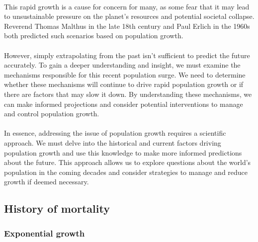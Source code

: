 \documentclass[../summary.tex]{subfiles}
\begin{document}
\ \\
This rapid growth is a cause for concern for many, as some fear that it may lead to unsustainable pressure on the planet's resources and potential societal collapse. Reverend Thomas Malthus in the late 18th century and Paul Erlich in the 1960s both predicted such scenarios based on population growth.\\
\\
However, simply extrapolating from the past isn't sufficient to predict the future accurately. To gain a deeper understanding and insight, we must examine the mechanisms responsible for this recent population surge. We need to determine whether these mechanisms will continue to drive rapid population growth or if there are factors that may slow it down. By understanding these mechanisms, we can make informed projections and consider potential interventions to manage and control population growth.\\
\\
In essence, addressing the issue of population growth requires a scientific approach. We must delve into the historical and current factors driving population growth and use this knowledge to make more informed predictions about the future. This approach allows us to explore questions about the world's population in the coming decades and consider strategies to manage and reduce growth if deemed necessary.
\newpage

\subsection{History of mortality}
\subsubsection{Exponential growth}
\end{document}
